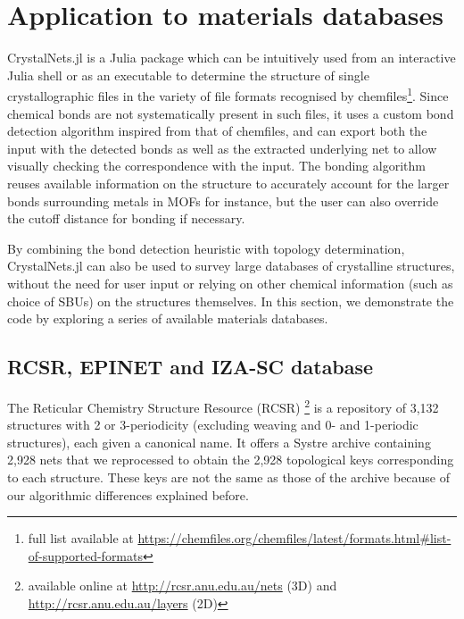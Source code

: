 \documentclass[main.tex]{subfiles}
\begin{document}


\section{Application to materials databases}

CrystalNets.jl is a Julia package which can be intuitively used from an interactive Julia shell or as an executable to determine the structure of single crystallographic files in the variety of file formats recognised by chemfiles\footnote{full list available at \url{https://chemfiles.org/chemfiles/latest/formats.html\#list-of-supported-formats}}. Since chemical bonds are not systematically present in such files, it uses a custom bond detection algorithm inspired from that of chemfiles, and can export both the input with the detected bonds as well as the extracted underlying net to allow visually checking the correspondence with the input. The bonding algorithm reuses available information on the structure to accurately account for the larger bonds surrounding metals in MOFs for instance, but the user can also override the cutoff distance for bonding if necessary.

By combining the bond detection heuristic with topology determination, CrystalNets.jl can also be used to survey large databases of crystalline structures, without the need for user input or relying on other chemical information (such as choice of SBUs) on the structures themselves. In this section, we demonstrate the code by exploring a series of available materials databases.

\subsection{RCSR, EPINET and IZA-SC database}

The Reticular Chemistry Structure Resource (RCSR) \autocite{RCSR} \footnote{available online at \url{http://rcsr.anu.edu.au/nets} (3D) and \url{http://rcsr.anu.edu.au/layers} (2D)} is a repository of 3,132 structures with 2 or 3-periodicity (excluding weaving and 0- and 1-periodic structures), each given a canonical name. It offers a Systre archive containing 2,928 nets that we reprocessed to obtain the 2,928 topological keys corresponding to each structure. These keys are not the same as those of the archive because of our algorithmic differences explained before.
\end{document}
